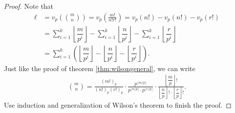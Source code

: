 \documentclass{subfile}
\begin{document}
	\begin{proof}
		Note that
			\begin{align*}
				\ell &= v_p\left(\binom{m}{n}\right) = v_p\left(\frac{m!}{n!r!}\right) = v_p(n!)-v_p(n!)-v_p(r!)\\
				&=\sum_{i=1}^{k}\left\lfloor\dfrac{m}{p^i}\right\rfloor - \sum_{i=1}^{k}\left\lfloor\dfrac{n}{p^i}\right\rfloor -\sum_{i=1}^{k}\left\lfloor\dfrac{r}{p^i}\right\rfloor\\
				&=\sum_{i=1}^{k}\left(\left\lfloor\dfrac{m}{p^i}\right\rfloor - \left\lfloor\dfrac{n}{p^i}\right\rfloor - \left\lfloor\dfrac{r}{p^i}\right\rfloor \right).
			\end{align*}
		Just like the proof of theorem \eqref{thm:wilsongeneral}, we can write
			\begin{align*}
				\binom {m}{n}=\frac{(m!)_p}{(n!)_p (r!)_p}\cdot
				\frac{p^{\lfloor m/p\rfloor}}{p^{\lfloor n/p\rfloor} \cdot p^{\lfloor r/p\rfloor}}\cdot
				\frac{\left\lfloor\dfrac{m}{p}\right\rfloor!}{\left\lfloor\dfrac{n}{p}\right\rfloor! \cdot \left\lfloor\dfrac{r}{p}\right\rfloor!}.
			\end{align*}
		Use induction and generalization of Wilson's theorem to finish the proof.
	\end{proof}
\end{document}
